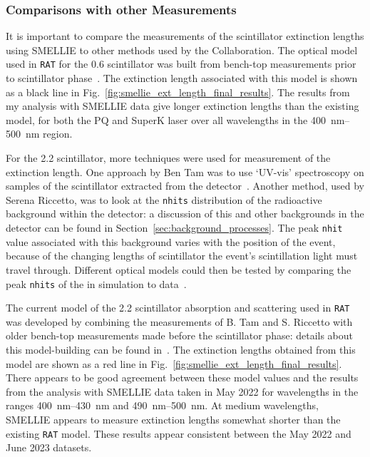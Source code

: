 \subsubsection{Comparisons with other Measurements}\label{sec:smellie_ext_length_comparison}
It is important to compare the measurements of the scintillator extinction lengths using SMELLIE to other methods used by the Collaboration. The optical model used in \texttt{RAT} for the \SI{0.6}{\gpl} scintillator was built from bench-top measurements prior to scintillator phase~\cite{seguiScintillatorModelComparison2015,kaptanogluOpticsOverviewProposed2016}. The extinction length associated with this model is shown as a black line in Fig.~\ref{fig:smellie_ext_length_final_results}. The results from my analysis with SMELLIE data give longer extinction lengths than the existing model, for both the PQ and SuperK laser over all wavelengths in the \SIrange{400}{500}{\nm} region.

For the \SI{2.2}{\gpl} scintillator, more techniques were used for measurement of the extinction length. One approach by Ben Tam was to use `UV-vis' spectroscopy on samples of the scintillator extracted from the detector~\cite{tamBenchtopAttenuationMeasurements2022}. %
Another method, used by Serena Riccetto, was to look at the \texttt{nhits} distribution of the radioactive background  within the detector: a discussion of this and other backgrounds in the detector can be found in Section~\ref{sec:background_processes}. The peak \texttt{nhit} value associated with this background varies with the position of the event, because of the changing lengths of scintillator the event's scintillation light must travel through. Different optical models could then be tested by comparing the peak \texttt{nhits} of the  in simulation to data~\cite{riccettoFullFill2102022}. %

The current model of the \SI{2.2}{\gpl} scintillator absorption and scattering used in \texttt{RAT} was developed by combining the measurements of B. Tam and S. Riccetto with older bench-top measurements made before the scintillator phase: details about this model-building can be found in~\cite{kaptanogluDocumentationAttenuationStudies2022,riccettoRATOptics2g2022}. %
The extinction lengths obtained from this model are shown as a red line in Fig.~\ref{fig:smellie_ext_length_final_results}. There appears to be good agreement between these model values and the results from the analysis with SMELLIE data taken in May 2022 for wavelengths in the ranges \SIrange{400}{430}{\nm} and \SIrange{490}{500}{\nm}. At medium wavelengths, SMELLIE appears to measure extinction lengths somewhat shorter than the existing \texttt{RAT} model. These results appear consistent between the May 2022 and June 2023 datasets.


